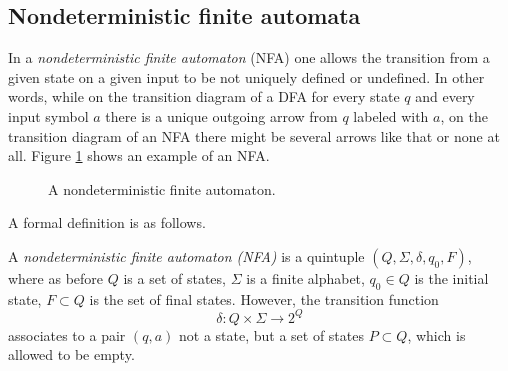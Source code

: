 \begin{page}

\subsection{Nondeterministic finite automata}
In a \emph{nondeterministic finite automaton} (NFA) one allows the transition from a given state on a given input to be not uniquely defined or undefined.
In other words, while on the transition diagram of a DFA for every state $q$ and every input symbol $a$ there is a unique outgoing arrow from $q$ labeled with $a$,
on the transition diagram of an NFA there might be several arrows like that or none at all.
Figure \ref{fig:NFA} shows an example of an NFA.

\begin{figure}[htb]
\begin{center}

\end{center}
\caption{A nondeterministic finite automaton.}
\label{fig:NFA}
\end{figure}

A formal definition is as follows.

\end{page}

\begin{page}

\begin{dfn}
A \emph{nondeterministic finite automaton (NFA)} is a quintuple $(Q, \Sigma, \delta, q_0, F)$, where as before
$Q$ is a set of states, $\Sigma$ is a finite alphabet, $q_0 \in Q$ is the initial state, $F \subset Q$ is the set of final states.
However, the transition function
\[
\delta \colon Q \times \Sigma \to 2^Q
\]
associates to a pair $(q,a)$ not a state, but a set of states $P \subset Q$, which is allowed to be empty.
\end{dfn}

\end{page}

